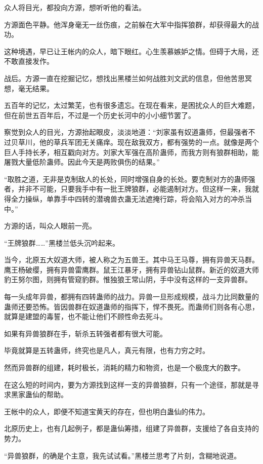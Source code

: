 \begin{this_body}
众人将目光，都投向方源，想听听他的看法。

方源面色平静。他浑身毫无一丝伤痕，之前躲在大军中指挥狼群，却获得最大的战功。

这种境遇，早已让王帐内的众人，暗下眼红。心生羡慕嫉妒之情。但碍于大局，还不敢直接发作。

战后。方源一直在挖掘记忆，想找出黑楼兰如何战胜刘文武的信息，但他苦思冥想，毫无结果。

五百年的记忆，太过繁芜，也有很多遗忘。在现在看来，是困扰众人的巨大难题，但在前世五百年后，不过是一个历史长河中的小小细节罢了。

察觉到众人的目光，方源抬起眼皮，淡淡地道：“刘家虽有奴道蛊师，但最强者不过贝草川，他的草兵军团无关痛痒。现在敌我双方，都有强势的一点。就像是两个巨人手持长矛，相互戳向对方。刘家大军强在高阶蛊师，而我方则有狼群相助，能屠戮大量低阶蛊师。因此今天是两败俱伤的结果。”

“取胜之道，无非是克制敌人的长处，同时增强自身的长处。要克制对方的蛊师强者，并非不可能，只要我手中有一批王牌狼群，必能遏制对方。但这样一来，我就得全力操纵，单靠手中四转的潜魂兽衣蛊无法遮掩行踪，将会陷入对方的冲杀当中。”

方源的话，叫众人眼前一亮。

“王牌狼群……”黑楼兰低头沉吟起来。

当今，北原五大奴道大师，被人称之为五兽王。其中马王马尊，拥有异兽天马群。鹰王杨破缨，拥有异兽雷鹰群。鼠王江暴牙，拥有异兽钻山鼠群。新近的奴道大师豹王努尔图，则拥有管窥豹群。惟独狼王常山阴，手中没有这样的一支异兽群。

每一头成年异兽，都拥有四转蛊师的战力。异兽一旦形成规模，战斗力比同数量的蛊师还要恐怖。皆因兽群在奴道蛊师的指挥下，悍不畏死。而蛊师们则各有心思，就算是建盟的毒誓，也不能让他们不顾性命去死斗。

如果有异兽狼群在手，斩杀五转强者都有很大可能。

毕竟就算是五转蛊师，终究也是凡人，真元有限，也有力穷之时。

然而异兽群的组建，耗时极长，消耗的精力和物资，也是一个极庞大的数字。

在这么短的时间内，要为方源找到这样一支的异兽狼群，只有一个途径，那就是寻求黑家蛊仙的帮助。

王帐中的众人，即便不知道宝黄天的存在，但也明白蛊仙的伟力。

北原历史上，也有几起例子，都是蛊仙筹措，组建了异兽群，支援给了各自支持的势力。

“异兽狼群，的确是个主意，我先试试看。”黑楼兰思考了片刻，含糊地说道。


\end{this_body}
